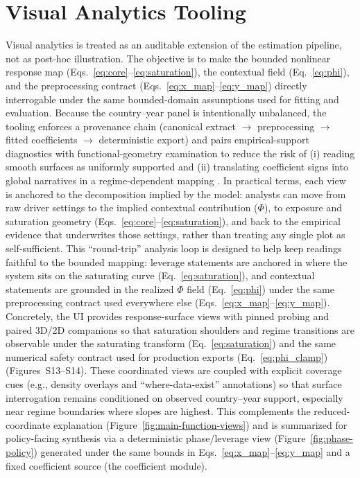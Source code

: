 \documentclass[11pt]{article}
\begin{document}
\section{Visual Analytics Tooling}
Visual analytics is treated as an auditable extension of the estimation pipeline, not as post-hoc illustration. The objective is to make the bounded nonlinear response map (Eqs.~\ref{eq:core}--\ref{eq:saturation}), the contextual field (Eq.~\ref{eq:phi}), and the preprocessing contract (Eqs.~\ref{eq:x_map}--\ref{eq:y_map}) directly interrogable under the same bounded-domain assumptions used for fitting and evaluation. Because the country--year panel is intentionally unbalanced, the tooling enforces a provenance chain (canonical extract $\rightarrow$ preprocessing $\rightarrow$ fitted coefficients $\rightarrow$ deterministic export) and pairs empirical-support diagnostics with functional-geometry examination to reduce the risk of (i) reading smooth surfaces as uniformly supported and (ii) translating coefficient signs into global narratives in a regime-dependent mapping \parencite{ThomasCook2005IlluminatingPath,Keim2010MasteringVisualAnalytics,MacEachren2005VisualizingUncertainty}. In practical terms, each view is anchored to the decomposition implied by the model: analysts can move from raw driver settings to the implied contextual contribution ($\Phi$), to exposure and saturation geometry (Eqs.~\ref{eq:core}--\ref{eq:saturation}), and back to the empirical evidence that underwrites those settings, rather than treating any single plot as self-sufficient. This ``round-trip'' analysis loop is designed to help keep readings faithful to the bounded mapping: leverage statements are anchored in where the system sits on the saturating curve (Eq.~\ref{eq:saturation}), and contextual statements are grounded in the realized $\Phi$ field (Eq.~\ref{eq:phi}) under the same preprocessing contract used everywhere else (Eqs.~\ref{eq:x_map}--\ref{eq:y_map}). Concretely, the UI provides response-surface views with pinned probing and paired 3D/2D companions so that saturation shoulders and regime transitions are observable under the saturating transform (Eq.~\ref{eq:saturation}) and the same numerical safety contract used for production exports (Eq.~\ref{eq:phi_clamp}) (Figures~S13--S14). These coordinated views are coupled with explicit coverage cues (e.g., density overlays and ``where-data-exist'' annotations) so that surface interrogation remains conditioned on observed country--year support, especially near regime boundaries where slopes are highest. This complements the reduced-coordinate explanation (Figure~\ref{fig:main-function-views}) and is summarized for policy-facing synthesis via a deterministic phase/leverage view (Figure~\ref{fig:phase-policy}) generated under the same bounds in Eqs.~\ref{eq:x_map}--\ref{eq:y_map} and a fixed coefficient source (the coefficient module).
\end{document}
